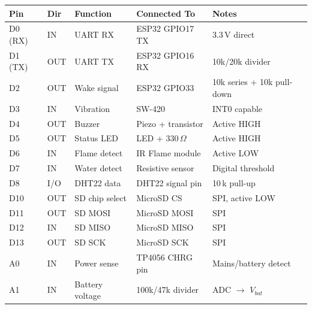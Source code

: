 \documentclass[12pt,a4paper]{article}
\begin{document}
\begin{table}[H]
\centering
\small
\begin{tabular}{@{} C{1.8cm} C{1.2cm} L{3.2cm} L{3.8cm} L{3cm} @{}}
\toprule
\textbf{Pin}   & \textbf{Dir} & \textbf{Function}   & \textbf{Connected To}          & \textbf{Notes}              \\
\midrule
D0 (RX)        & IN           & UART RX             & ESP32 GPIO17 TX                & 3.3\,V direct               \\
D1 (TX)        & OUT          & UART TX             & ESP32 GPIO16 RX                & 10k/20k divider             \\
D2             & OUT          & Wake signal         & ESP32 GPIO33                   & 10k series + 10k pull-down  \\
D3             & IN           & Vibration           & SW-420                         & INT0 capable                \\
D4             & OUT          & Buzzer              & Piezo + transistor             & Active HIGH                 \\
D5             & OUT          & Status LED          & LED + 330\,$\Omega$            & Active HIGH                 \\
D6             & IN           & Flame detect        & IR Flame module                & Active LOW                  \\
D7             & IN           & Water detect        & Resistive sensor               & Digital threshold           \\
D8             & I/O          & DHT22 data          & DHT22 signal pin               & 10\,k pull-up               \\
D10            & OUT          & SD chip select      & MicroSD CS                     & SPI, active LOW             \\
D11            & OUT          & SD MOSI             & MicroSD MOSI                   & SPI                         \\
D12            & IN           & SD MISO             & MicroSD MISO                   & SPI                         \\
D13            & OUT          & SD SCK              & MicroSD SCK                    & SPI                         \\
A0             & IN           & Power sense         & TP4056 CHRG pin                & Mains/battery detect        \\
A1             & IN           & Battery voltage     & 100k/47k divider               & ADC $\rightarrow$ $V_{bat}$ \\

\end{tabular}
\end{table}
\end{document}
